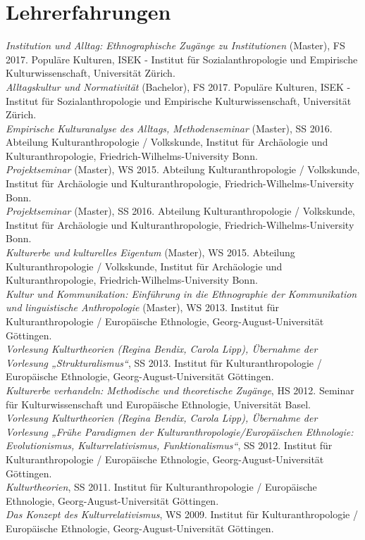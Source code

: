 \documentclass[11pt, a4paper]{article} %
\begin{document}
\section*{Lehrerfahrungen}
\emph{Institution und Alltag: Ethnographische Zugänge zu Institutionen} (Master), FS 2017. Populäre Kulturen, ISEK - Institut für Sozialanthropologie und Empirische Kulturwissenschaft, Universität Zürich.\\[.25cm]
\emph{Alltagskultur und Normativität} (Bachelor), FS 2017. Populäre Kulturen, ISEK - Institut für Sozialanthropologie und Empirische Kulturwissenschaft, Universität Zürich.\\[.25cm]
\emph{Empirische Kulturanalyse des Alltags, Methodenseminar} (Master), SS 2016. Abteilung Kulturanthropologie / Volkskunde, Institut für Archäologie und Kulturanthropologie, Friedrich-Wilhelms-University Bonn.\\[.25cm]
\emph{Projektseminar} (Master), WS 2015. Abteilung Kulturanthropologie / Volkskunde, Institut für Archäologie und Kulturanthropologie, Friedrich-Wilhelms-University Bonn.\\[.25cm]
\emph{Projektseminar} (Master), SS 2016. Abteilung Kulturanthropologie / Volkskunde, Institut für Archäologie und Kulturanthropologie, Friedrich-Wilhelms-University Bonn.\\[.25cm]
\emph{Kulturerbe und kulturelles Eigentum} (Master), WS 2015. Abteilung Kulturanthropologie / Volkskunde, Institut für Archäologie und Kulturanthropologie, Friedrich-Wilhelms-University Bonn.\\[.25cm]
\emph{Kultur und Kommunikation: Einführung in die Ethnographie der Kommunikation und linguistische Anthropologie} (Master), WS 2013. Institut für Kulturanthropologie / Europäische Ethnologie, Georg-August-Universität Göttingen.\\[.25cm]
\emph{Vorlesung Kulturtheorien (Regina Bendix, Carola Lipp), Übernahme der Vorlesung „Strukturalismus“}, SS 2013. Institut für Kulturanthropologie / Europäische Ethnologie, Georg-August-Universität Göttingen.\\[.25cm]
\emph{Kulturerbe verhandeln: Methodische und theoretische Zugänge}, HS 2012. Seminar für Kulturwissenschaft und Europäische Ethnologie, Universität Basel.\\[.25cm]
\emph{Vorlesung Kulturtheorien (Regina Bendix, Carola Lipp), Übernahme der Vorlesung „Frühe Paradigmen der Kulturanthropologie/Europäischen Ethnologie: Evolutionismus, Kulturrelativismus, Funktionalismus“}, SS 2012. Institut für Kulturanthropologie / Europäische Ethnologie, Georg-August-Universität Göttingen.\\[.25cm]
\emph{Kulturtheorien}, SS 2011. Institut für Kulturanthropologie / Europäische Ethnologie, Georg-August-Universität Göttingen.\\[.25cm]
\emph{Das Konzept des Kulturrelativismus}, WS 2009. Institut für Kulturanthropologie / Europäische Ethnologie, Georg-August-Universität Göttingen. 
\end{document}
